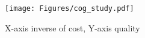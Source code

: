 {
\begin{figure}[h]
\begin{center}
\centerline{\texttt{[image: Figures/cog\_study.pdf]}}
\end{center}
\vspace{-0.3in}
{
X-axis inverse of cost, Y-axis quality
}
\vspace{0.05in}
\end{figure}
}